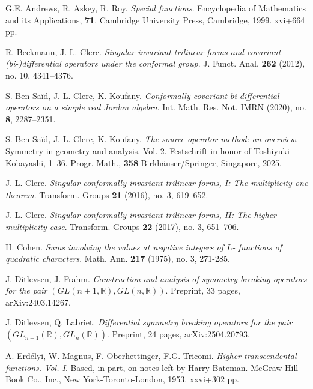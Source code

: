 \documentclass[12pt, pdflatex, a4paper]{article}
\theoremstyle{plain}
\theoremstyle{definition}
\def\R{{\mathbb R}}
\begin{document}
\renewcommand{\refname}{References}
\begin{thebibliography}{}
G.E. Andrews, R. Askey, R. Roy.
\textit{Special functions}.
Encyclopedia of Mathematics and its Applications, \textbf{71}. Cambridge University Press, Cambridge, 1999. xvi+664 pp.

R. Beckmann, J.-L. Clerc.
\textit{Singular invariant trilinear forms and covariant (bi-)differential operators under the conformal group}.
J. Funct. Anal. \textbf{262} (2012), no. 10, 4341–4376.

S. Ben Saïd, J.-L. Clerc, K. Koufany.
\textit{Conformally covariant bi-differential operators on a simple real Jordan algebra}.
Int. Math. Res. Not. IMRN (2020), no. \textbf{8}, 2287–2351.

S. Ben Saïd, J.-L. Clerc, K. Koufany.
\textit{The source operator method: an overview}.
Symmetry in geometry and analysis. Vol. 2. Festschrift in honor of Toshiyuki Kobayashi, 1–36. Progr. Math., \textbf{358}
Birkhäuser/Springer, Singapore, 2025.

J.-L. Clerc.
\textit{Singular conformally invariant trilinear forms, I: The multiplicity one theorem}.
Transform. Groups \textbf{21} (2016), no. 3, 619–652.

J.-L. Clerc.
\textit{Singular conformally invariant trilinear forms, II: The higher multiplicity case}.
Transform. Groups \textbf{22} (2017), no. 3, 651–706.

H. Cohen.
\textit{Sums involving the values at negative integers of $L$- functions of quadratic characters}.
Math. Ann. \textbf{217} (1975), no. 3, 271-285.

J. Ditlevsen, J. Frahm.
\textit{Construction and analysis of symmetry breaking operators for the pair $(GL(n+1,\R),GL(n,\R))$}. 
Preprint, 33 pages, 	arXiv:2403.14267.

J. Ditlevsen, Q. Labriet.
\textit{Differential symmetry breaking operators for the pair $(GL_{n+1}(\R), GL_n(\R))$}. 
Preprint, 24 pages, arXiv:2504.20793.

A. Erdélyi, W. Magnus, F. Oberhettinger, F.G. Tricomi.
\textit{Higher transcendental functions. Vol. I}.
Based, in part, on notes left by Harry Bateman. McGraw-Hill Book Co., Inc., New York-Toronto-London, 1953. xxvi+302 pp.


\end{thebibliography}
\end{document}
